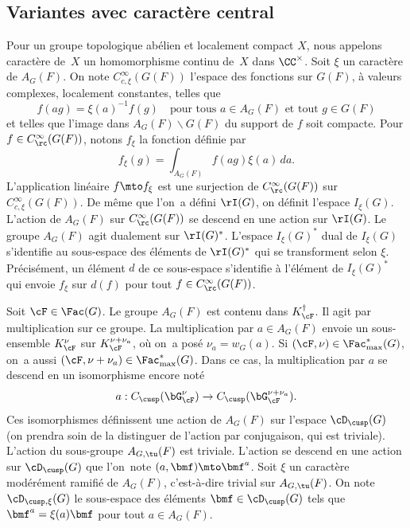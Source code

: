 \subsection{Variantes avec caractère central}\label{varianteaveccaracterecentral}
Pour un groupe topologique abélien et localement compact $X$, nous appelons caractère de~$X$ un homomorphisme continu de~$X$ dans $\CC^{\times}$.
Soit $\xi$ un caractère de $A_{G}(F)$. On note $C_{c,\xi}^{\infty}(G(F))$ l'espace des fonctions sur $G(F)$, à valeurs complexes, localement constantes, telles que
\[
f(ag)=\xi(a)^{-1}f(g)\quad \text{pour tous $a\in A_{G}(F)$ et tout $g\in G(F)$}
\]
et telles que l'image dans $A_{G}(F)\backslash G(F)$ du support de $f$ soit compacte. Pour $f\in C_{\rc}^{\infty}(G(F))$, notons $f_{\xi}$ la fonction définie par
\[
f_{\xi}(g)=\int_{A_{G}(F)}f(ag)\xi(a)\,da.
\]
L'application linéaire $f\mto f_{\xi}$ est une surjection de $C_{\rc}^{\infty}(G(F))$ sur $ C_{c,\xi}^{\infty}(G(F))$. De même que l'on~a défini $\rI(G)$, on définit l'espace $I_{\xi}(G)$. L'action de $A_{G}(F)$ sur $C_{\rc}^{\infty}(G(F))$ se descend en une action sur $\rI(G)$. Le groupe $A_{G}(F)$ agit dualement sur $\rI(G)^*$. L'espace $I_{\xi}(G)^*$ dual de $I_{\xi}(G)$ s'identifie au sous-espace des éléments de $\rI(G)^*$ qui se transforment selon $\xi$. Précisément, un élément $d$ de ce sous-espace s'identifie à l'élément de $I_{\xi}(G)^*$ qui envoie $f_{\xi}$ sur $d(f)$ pour tout $f\in C_{\rc}^{\infty}(G(F))$.

Soit $\cF\in \Fac(G)$. Le groupe $A_{G}(F)$ est contenu dans $K_{\cF}^{\dag}$. Il agit par multiplication sur ce groupe. La multiplication par $a\in A_{G}(F)$ envoie un sous-ensemble $K_{\cF}^{\nu}$ sur $K_{\cF}^{\nu+\nu_{a}}$, où on~a posé $\nu_{a}=w_{G}(a)$. Si $(\cF,\nu)\in \Fac^*_{\max}(G)$, on~a aussi $(\cF,\nu+\nu_{a})\in \Fac^*_{\max}(G)$. Dans ce cas, la multiplication par $a$ se descend en un isomorphisme encore noté
\[
a:C_{\cusp}(\bG_{\cF}^{\nu})\to C_{\cusp}(\bG_{\cF}^{\nu+\nu_{a}}).
\]
Ces isomorphismes définissent une action de $A_{G}(F)$ sur l'espace $\boldsymbol{\cD}_{\cusp}(G)$ (on prendra soin de la distinguer de l'action par conjugaison, qui est triviale). L'action du sous-groupe $A_{G,\tu}(F)$ est triviale. L'action se descend en une action sur $\cD_{\cusp}(G)$ que l'on~note $(a,\bmf)\mto \bmf^{a}$. Soit $\xi$ un caractère modérément ramifié de $A_{G}(F)$, c'est-à-dire trivial sur $A_{G,\tu}(F)$. On note $\cD_{\cusp,\xi}(G)$ le sous-espace des éléments $\bmf\in \cD_{\cusp}(G)$ tels que $\bmf^{a}=\xi(a)\bmf$ pour tout $a\in A_{G}(F)$.

